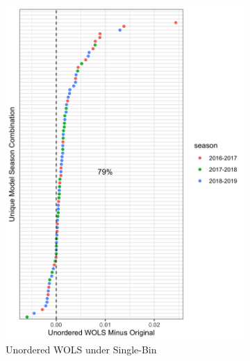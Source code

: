 \documentclass{umassthesis}          %
\begin{document}
  \begin{figure}
   \begin{subfigure}{.5\textwidth}
  \centering
\includegraphics[scale=.15]{single_bin_unordered.png}
 \caption{Unordered WOLS under Single-Bin}
\end{subfigure}%
\begin{subfigure}{.5\textwidth}
  \centering

\end{subfigure}
\end{figure}
\end{document}
